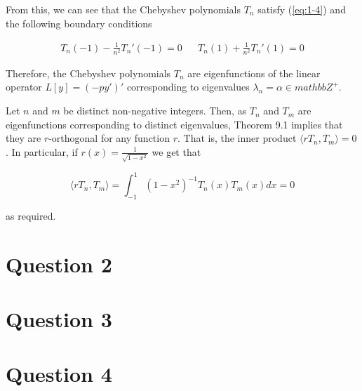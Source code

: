 \documentclass{article}
\begin{document}
From this, we can see that the Chebyshev polynomials $T_n$ satisfy (\ref{eq:1-4}) and the
following boundary conditions

\begin{align} \label{eq:1-6}
    T_n(-1) - \frac{1}{n^2}T_n'(-1) = 0 && T_n(1) + \frac{1}{n^2}T_n'(1) = 0
\end{align}

Therefore, the Chebyshev polynomials $T_n$ are eigenfunctions of the linear operator
$L[y] = (-py')'$ corresponding to eigenvalues $\lambda_n = \alpha \in mathbb{Z}^+$.

\hfill\break
Let $n$ and $m$ be distinct non-negative integers. Then, as $T_n$ and $T_m$
are eigenfunctions corresponding to distinct eigenvalues, Theorem 9.1 implies
that they are $r$-orthogonal for any function $r$. That is, the inner product
$\langle rT_n, T_m \rangle = 0$. In particular, if $r(x) = \frac{1}{\sqrt{1 - x^2}}$
we get that

\begin{equation*}
    \langle rT_n, T_m \rangle = \int_{-1}^{1}(1 - x^2)^{-1}T_n(x)T_m(x) dx = 0
\end{equation*}

as required.

\section*{Question 2}

\section*{Question 3}

\section*{Question 4}
\end{document}
